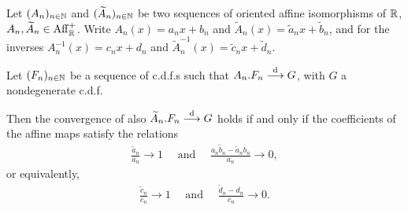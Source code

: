 \begin{theorem}
  \label{thm:convergence-to-types-different-affine}
  Let $(A_n)_{n \in \mathbb{N}}$ and
  $(\widetilde{A}_n)_{n \in \mathbb{N}}$ be two sequences of oriented
  affine isomorphisms of $\mathbb{R}$, $A_n, \widetilde{A}_n \in \mathrm{Aff}^+_{\mathbb{R}}$.
  Write $A_n(x) = a_n x + b_n$
  and $\widetilde{A}_n(x) = \tilde{a}_n x + \tilde{b}_n$,
  and for the inverses $A_n^{-1}(x) = c_n x + d_n$
  and $\widetilde{A}^{-1}_n(x) = \tilde{c}_n x + \tilde{d}_n$.

  Let $(F_n)_{n \in \mathbb{N}}$ be a sequence of c.d.f.s
  such that $A_n.F_n \overset{\mathrm{d}}{\longrightarrow} G$, with
  $G$ a nondegenerate c.d.f.

  Then the convergence of also $\widetilde{A}_n.F_n \overset{\mathrm{d}}{\longrightarrow} G$
  holds if and only if the coefficients of the affine maps
  satisfy the relations
  \begin{align*}
    \frac{\tilde{a}_n}{a_n} \to 1
    \quad \text{ and } \quad
    \frac{a_n \tilde{b}_n - \tilde{a}_n b_n}{a_n} \to 0,
  \end{align*}
  or equivalently,
  \begin{align*}
    \frac{\tilde{c}_n}{c_n} \to 1
    \quad \text{ and } \quad
    \frac{\tilde{d}_n - d_n}{c_n} \to 0 .
  \end{align*}
\end{theorem}
